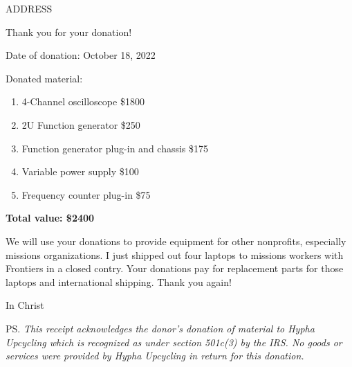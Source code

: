\documentclass{letter}
\begin{document}
\begin{letter}{ADDRESS}

	\opening{Thank you for your donation!}	
	Date of donation: October 18, 2022
	
	Donated material:
	\begin{enumerate}
		\item 4-Channel oscilloscope \$1800
		\item 2U Function generator \$250
		\item Function generator plug-in and chassis \$175
		\item Variable power supply \$100
		\item Frequency counter plug-in \$75

	\end{enumerate}

	\textbf{Total value: \$2400}
	
	We will use your donations to provide equipment for other nonprofits, especially missions organizations.
	I just shipped out four laptops to missions workers with Frontiers in a closed contry.
	Your donations pay for replacement parts for those laptops and international shipping.
	Thank you again!
	
	\closing{In Christ}

	\vspace*{\fill}
	\ps
	\textsl{This receipt acknowledges the donor's donation of material to Hypha Upcycling
	which is recognized as under section 501c(3) by the IRS.
	No goods or services were provided by Hypha Upcycling in return for this donation.
	}

\end{letter}
\end{document}
